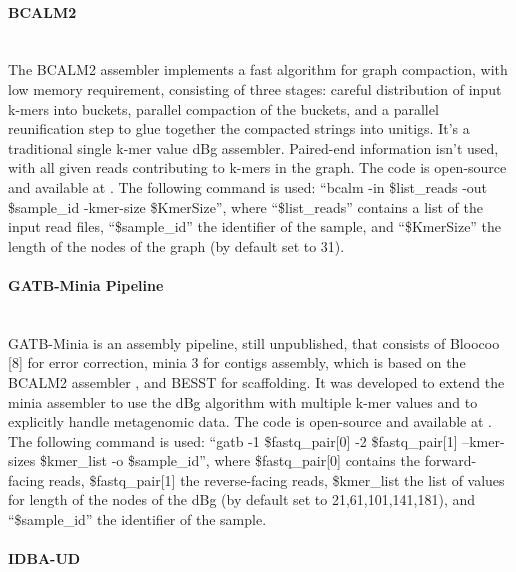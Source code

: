 \paragraph{BCALM2} \mbox{}\\

The BCALM2 assembler \cite{chikhi_compacting_2016} implements a fast algorithm for graph compaction, with low memory requirement, consisting of three stages: careful distribution of input k-mers into buckets, parallel compaction of the buckets, and a parallel reunification step to glue together the compacted strings into unitigs. It’s a traditional single k-mer value dBg assembler. Paired-end information isn’t used, with all given reads contributing to k-mers in the graph. The code is open-source and available at \cite{noauthor_bcalm_2022}. The following command is used: “bcalm -in \$list\_reads -out \$sample\_id -kmer-size \$KmerSize”, where “\$list\_reads” contains a list of the input read files, “\$sample\_id” the identifier of the sample, and “\$KmerSize” the length of the nodes of the graph (by default set to 31). 

\paragraph{GATB-Minia Pipeline} \mbox{}\\

GATB-Minia is an assembly pipeline, still unpublished, that consists of Bloocoo [8] for error correction, minia 3 \cite{chikhi_space-efficient_2013} for contigs assembly, which is based on the BCALM2 assembler \cite{chikhi_compacting_2016}, and BESST \cite{sahlin_besst_2014} for scaffolding. It was developed to extend the minia assembler to use the dBg algorithm with multiple k-mer values and to explicitly handle metagenomic data. The code is open-source and available at \cite{noauthor_gatbgatb-minia-pipeline_2022}. The following command is used: “gatb -1 \$fastq\_pair[0] -2 \$fastq\_pair[1] --kmer-sizes \$kmer\_list -o \$sample\_id”, where \$fastq\_pair[0] contains the forward-facing reads, \$fastq\_pair[1] the reverse-facing reads, \$kmer\_list the list of values for length of the nodes of the dBg (by default set to 21,61,101,141,181), and “\$sample\_id” the identifier of the sample. 

\paragraph{IDBA-UD} \mbox{}\\


